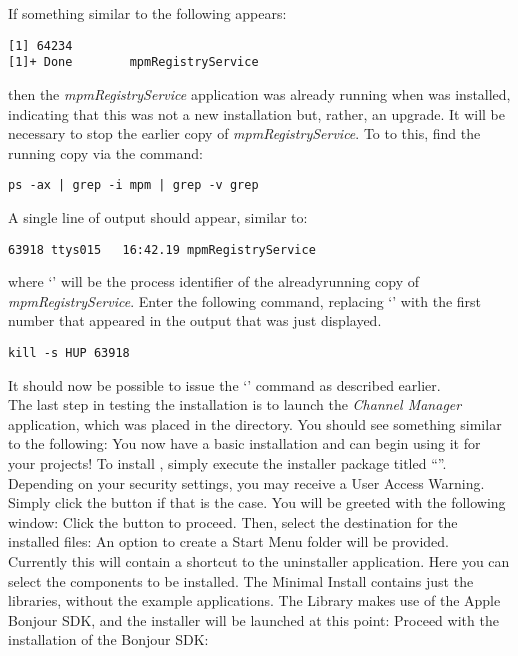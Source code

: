 If something similar to the following appears:
\outputBegin{}
\begin{verbatim}
[1] 64234
[1]+ Done        mpmRegistryService
\end{verbatim}
\outputEnd{}
then the \emph{mpmRegistryService} application was already running when \mplusm{} was
installed, indicating that this was not a new installation but, rather, an upgrade.
\condPage{}
It will be necessary to stop the earlier copy of \emph{mpmRegistryService}.
To to this, find the running copy via the command:
\outputBegin{}
\begin{verbatim}
ps -ax | grep -i mpm | grep -v grep
\end{verbatim}
\outputEnd{}
A single line of output should appear, similar to:
\outputBegin{}
\begin{verbatim}
63918 ttys015   16:42.19 mpmRegistryService
\end{verbatim}
\outputEnd{}
where `' will be the process identifier of the already\longDash{}running
copy of \emph{mpmRegistryService}.
Enter the following command, replacing `' with the first number that
appeared in the output that was just displayed.
\outputBegin{}
\begin{verbatim}
kill -s HUP 63918
\end{verbatim}
\outputEnd{}
It should now be possible to issue the `' command as
described earlier.\\

The last step in testing the \mplusm{} installation is to launch the
\emph{Channel Manager} application, which was placed in the 
directory.
You should see something similar to the following:
You now have a basic \mplusm{} installation and can begin using it for your projects!
\tertiaryEnd{}
\secondaryEnd{}
\condPage{}
To install \mplusm, simply execute the installer package titled
``''.
Depending on your security settings, you may receive a User Access Warning.
Simply click the  button if that is the case.
You will be greeted with the following window:
Click the  button to proceed.
\condPage{}
Then, select the destination for the installed files:
An option to create a Start Menu folder will be provided.
Currently this will contain a shortcut to the uninstaller application.
\condPage{}
Here you can select the components to be installed.
The Minimal Install contains just the libraries, without the example applications.
The \mplusm{} Library makes use of the Apple Bonjour SDK, and the installer will be
launched at this point:
\condPage{}
Proceed with the installation of the Bonjour SDK:


